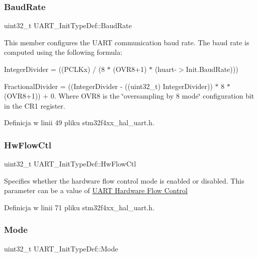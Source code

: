 \subsubsection{\texorpdfstring{Baud\+Rate}{BaudRate}}
{\footnotesize\ttfamily uint32\+\_\+t U\+A\+R\+T\+\_\+\+Init\+Type\+Def\+::\+Baud\+Rate}

This member configures the U\+A\+RT communication baud rate. The baud rate is computed using the following formula\+:
\begin{DoxyItemize}
\item Integer\+Divider = ((P\+C\+L\+Kx) / (8 $\ast$ (O\+V\+R8+1) $\ast$ (huart-\/$>$Init.\+Baud\+Rate)))
\item Fractional\+Divider = ((Integer\+Divider -\/ ((uint32\+\_\+t) Integer\+Divider)) $\ast$ 8 $\ast$ (O\+V\+R8+1)) + 0. Where O\+V\+R8 is the \char`\"{}oversampling by 8 mode\char`\"{} configuration bit in the C\+R1 register. 
\end{DoxyItemize}

Definicja w linii 49 pliku stm32f4xx\+\_\+hal\+\_\+uart.\+h.

\mbox{\label{struct_u_a_r_t___init_type_def_adbf4734130666b94201c6658464c1622}} 
\subsubsection{\texorpdfstring{Hw\+Flow\+Ctl}{HwFlowCtl}}
{\footnotesize\ttfamily uint32\+\_\+t U\+A\+R\+T\+\_\+\+Init\+Type\+Def\+::\+Hw\+Flow\+Ctl}

Specifies whether the hardware flow control mode is enabled or disabled. This parameter can be a value of \hyperlink{group___u_a_r_t___hardware___flow___control}{U\+A\+RT Hardware Flow Control} 

Definicja w linii 71 pliku stm32f4xx\+\_\+hal\+\_\+uart.\+h.

\mbox{\label{struct_u_a_r_t___init_type_def_ab2ee6ea5a5d4ca5ee6b759be197bcfcb}} 
\subsubsection{\texorpdfstring{Mode}{Mode}}
{\footnotesize\ttfamily uint32\+\_\+t U\+A\+R\+T\+\_\+\+Init\+Type\+Def\+::\+Mode}

